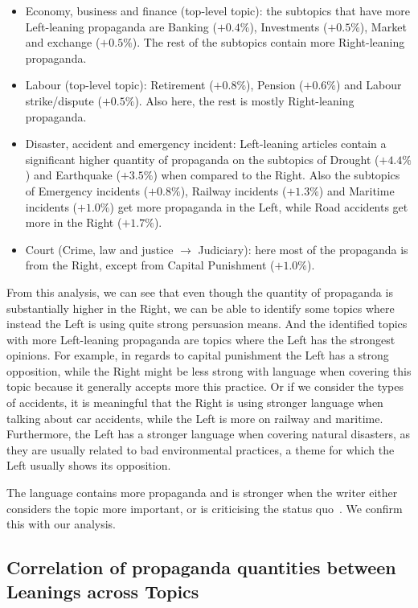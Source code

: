\begin{itemize}
    \item Economy, business and finance (top-level topic): the subtopics that have more Left-leaning propaganda  are Banking ($+0.4\%$), Investments ($+0.5\%$), Market and exchange ($+0.5\%$). The rest of the subtopics contain more Right-leaning propaganda.
    \item Labour (top-level topic): Retirement ($+0.8\%$), Pension ($+0.6\%$) and Labour strike/dispute ($+0.5\%$). Also here, the rest is mostly Right-leaning propaganda.
    \item Disaster, accident and emergency incident: Left-leaning articles contain a significant higher quantity of propaganda on the subtopics of Drought ($+4.4\%$) and Earthquake ($+3.5\%$) when compared to the Right. Also the subtopics of Emergency incidents ($+0.8\%$), Railway incidents ($+1.3\%$) and Maritime incidents ($+1.0\%$) get more propaganda in the Left, while Road accidents get more in the Right ($+1.7\%$).
    \item Court (Crime, law and justice $\rightarrow$ Judiciary): here most of the propaganda is from the Right, except from Capital Punishment ($+1.0\%$).
\end{itemize}

From this analysis, we can see that even though the quantity of propaganda is substantially higher in the Right, we can be able to identify some topics where instead the Left is using quite strong persuasion means.
And the identified topics with more Left-leaning propaganda are topics where the Left has the strongest opinions. For example, in regards to capital punishment the Left has a strong opposition, while the Right might be less strong with language when covering this topic because it generally accepts more this practice.
Or if we consider the types of accidents, it is meaningful that the Right is using stronger language when talking about car accidents, while the Left is more on railway and maritime. Furthermore, the Left has a stronger language when covering natural disasters, as they are usually related to bad environmental practices, a theme for which the Left usually shows its opposition.

The language contains more propaganda and is stronger when the writer either considers the topic more important, or is criticising the status quo~\citep{rose1992political}. We confirm this with our analysis.  


\subsection{\statusgreen Correlation of propaganda quantities between Leanings across Topics}
\label{ssec:topic_propaganda_leaning_tech_quantities}

